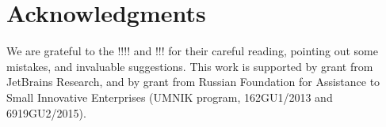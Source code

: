 \section*{Acknowledgments}

We are grateful to the !!!! and !!! for their careful reading, pointing out some mistakes, and invaluable suggestions.
This work is supported by grant from JetBrains Research, and by grant from Russian Foundation for Assistance to Small Innovative Enterprises (UMNIK program, \textnumero 162GU1/2013 and \textnumero 6919GU2/2015).
